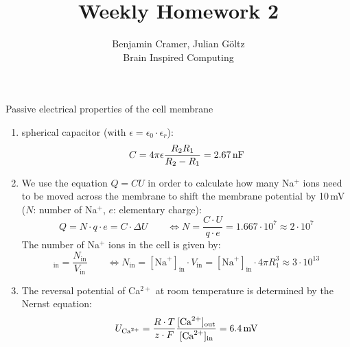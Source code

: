 \documentclass[12pt]{article}
\newenvironment{exercise}[2][Exercise]{\begin{trivlist}
\item[\hskip \labelsep {\bfseries #1}\hskip \labelsep {\bfseries #2.}]}{\end{trivlist}}
\begin{document}
 
 
\title{Weekly Homework 2}
\author{Benjamin Cramer, Julian G\"oltz\\
Brain Inspired Computing}
 
\maketitle
 
\begin{exercise}{2.1}
Passive electrical properties of the cell membrane \\
\renewcommand{\labelenumi}{\alph{enumi})}
\begin{enumerate}
\item spherical capacitor (with $\epsilon = \epsilon_0 \cdot \epsilon_r$):
	\begin{equation}
		C=4\pi\epsilon \frac{R_2R_1}{R_2 - R_1} = 2.67\text{\,nF}
	\end{equation}
\item We use the equation $Q=CU$ in order to calculate how many Na$^+$ ions need to be moved across the membrane to shift the membrane potential by 10\,mV ($N$: number of Na$^+$, $e$: elementary charge):
	\begin{equation}
		Q=N\cdot q \cdot e = C\cdot \Delta U \qquad \Leftrightarrow N = \frac{C\cdot U}{q \cdot e} = 1.667\cdot 10^7 \approx 2\cdot 10^7
	\end{equation}
	The number of Na$^+$ ions in the cell is given by:
	\begin{equation}
		[\text{Na}^+]_{\text{in}} = \frac{N_{\text{in}}}{V_{\text{in}}} \qquad \Leftrightarrow N_{\text{in}} = [\text{Na}^+]_{\text{in}} \cdot V_{\text{in}} = [\text{Na}^+]_{\text{in}} \cdot 4\pi R_1^3 \approx 3\cdot 10^{13}
	\end{equation}
\item The reversal potential of Ca$^{2+}$ at room temperature is determined by the Nernst equation:
	\begin{equation}
		U_{\text{Ca}^{2+}} = \frac{R\cdot T}{z\cdot F} \frac{[\text{Ca}^{2+}]_{\text{out}}}{[\text{Ca}^{2+}]_{\text{in}}} = 6.4\text{\,mV}
	\end{equation}
\end{enumerate}

\end{exercise}
 
\end{document}
